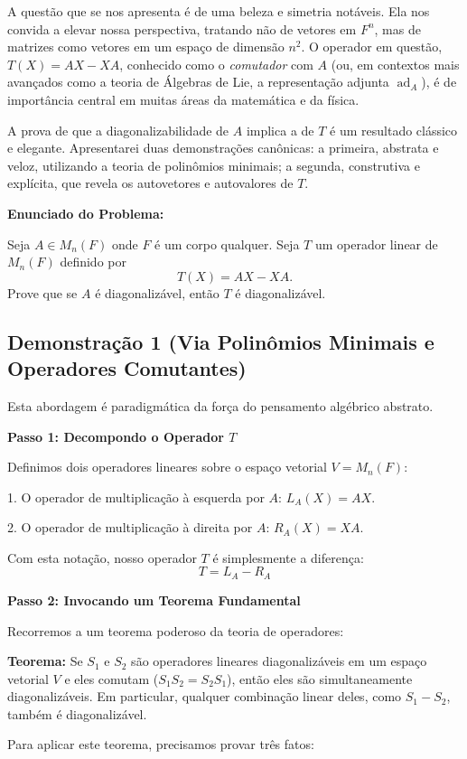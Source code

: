 A questão que se nos apresenta é de uma beleza e simetria notáveis. Ela nos convida a elevar nossa
perspectiva, tratando não de vetores em $F^n$, mas de matrizes como vetores em um espaço de
dimensão $n^2$. O operador em questão, $T(X) = AX - XA$, conhecido como o \textit{comutador} com
$A$ (ou, em contextos mais avançados como a teoria de Álgebras de Lie, a representação adjunta
$\operatorname{ad}_A$), é de importância central em muitas áreas da matemática e da física.

A prova de que a diagonalizabilidade de $A$ implica a de $T$ é um resultado clássico e elegante.
Apresentarei duas demonstrações canônicas: a primeira, abstrata e veloz, utilizando a teoria de
polinômios minimais; a segunda, construtiva e explícita, que revela os autovetores e autovalores de $T$.

\textbf{Enunciado do Problema:}

Seja $A \in M_n(F)$ onde $F$ é um corpo qualquer. Seja $T$ um operador linear de $M_n(F)$ definido por
\[
T(X) = AX - XA.
\]
Prove que se $A$ é diagonalizável, então $T$ é diagonalizável.

\subsection*{Demonstração 1 (Via Polinômios Minimais e Operadores Comutantes)}

Esta abordagem é paradigmática da força do pensamento algébrico abstrato.

\textbf{Passo 1: Decompondo o Operador $T$}

Definimos dois operadores lineares sobre o espaço vetorial $V = M_n(F)$:

1. O operador de multiplicação à esquerda por $A$: $L_A(X) = AX$.

2. O operador de multiplicação à direita por $A$: $R_A(X) = XA$.

Com esta notação, nosso operador $T$ é simplesmente a diferença:
\[
T = L_A - R_A
\]

\textbf{Passo 2: Invocando um Teorema Fundamental}

Recorremos a um teorema poderoso da teoria de operadores:

\textbf{Teorema:} Se $S_1$ e $S_2$ são operadores lineares diagonalizáveis em um espaço vetorial $V$ e eles
comutam ($S_1S_2 = S_2S_1$), então eles são simultaneamente diagonalizáveis. Em particular, qualquer
combinação linear deles, como $S_1 - S_2$, também é diagonalizável.

Para aplicar este teorema, precisamos provar três fatos:

